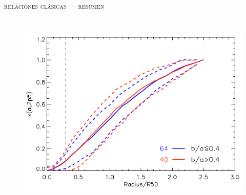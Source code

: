 \documentclass[xcolor=dvipsnames,4pt,fleqn,hyperref={colorlinks,citecolor=black,linkcolor=black,urlcolor=black}]{beamer}
\begin{document}
\begin{frame}{\textsc{relaciones clásicas --- resumen}}
\begin{columns}
\begin{figure}
\flushright\citep{Iglesias-Paramo2013}
\includegraphics[scale=0.6]{img/iglesias-paramo2013-1}
\end{figure}
\end{columns}
\end{frame}
\end{document}
